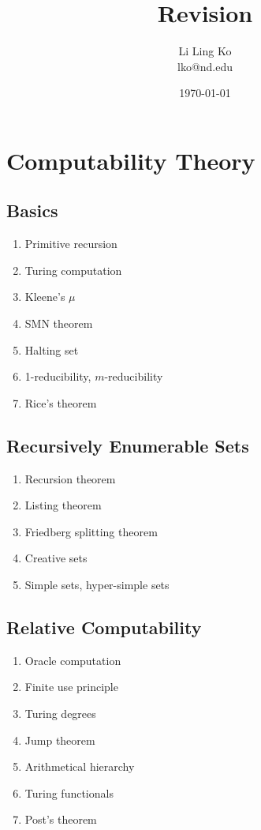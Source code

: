 \documentclass{article}
\begin{document}
\title{Revision}
\author{Li Ling Ko\\ lko@nd.edu}
\date{\today}
\maketitle

\section{Computability Theory}
\subsection{Basics}
\begin{enumerate}
  \item Primitive recursion
  \item Turing computation
  \item Kleene's $\mu$
  \item SMN theorem
  \item Halting set
  \item 1-reducibility, $m$-reducibility
  \item Rice's theorem
\end{enumerate}

\subsection{Recursively Enumerable Sets} 
\begin{enumerate}
  \item Recursion theorem
  \item Listing theorem
  \item Friedberg splitting theorem
  \item Creative sets
  \item Simple sets, hyper-simple sets
\end{enumerate}

\subsection{Relative Computability} 
\begin{enumerate}
  \item Oracle computation
  \item Finite use principle
  \item Turing degrees
  \item Jump theorem
  \item Arithmetical hierarchy
  \item Turing functionals
  \item Post's theorem
\end{enumerate}
\end{document}
